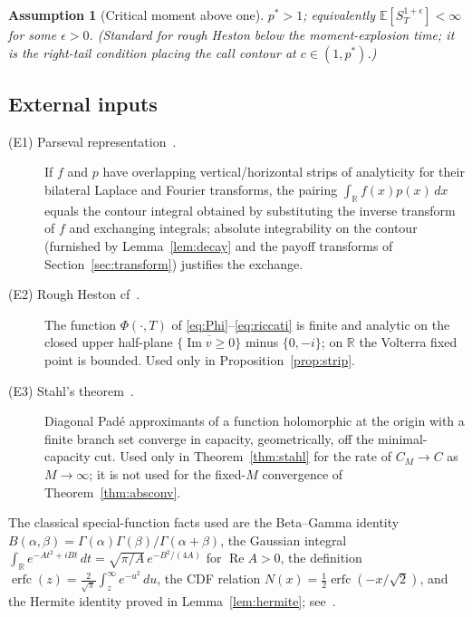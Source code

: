 \documentclass[11pt]{article}
\newtheorem{assumption}[theorem]{Assumption}
\newcommand{\R}{\mathbb{R}}
\newcommand{\E}{\mathbb{E}}
\DeclareMathOperator{\Real}{Re}
\DeclareMathOperator{\Imag}{Im}
\DeclareMathOperator{\erfc}{erfc}
\begin{document}
\begin{assumption}[Critical moment above one]\label{A4}
$p^*>1$; equivalently $\E[S_T^{1+\epsilon}]<\infty$ for some $\epsilon>0$.
\textup{(Standard for rough Heston below the moment-explosion time; it is
the right-tail condition placing the call contour at $c\in(1,p^*)$.)}
\end{assumption}

\subsection{External inputs}

\begin{description}
\item[(E1) Parseval representation~\cite{Widder}.] If $f$ and
$p$ have overlapping vertical/horizontal strips of analyticity for their
bilateral Laplace and Fourier transforms, the pairing $\int_\R f(x)p(x)\,dx$
equals the contour integral obtained by substituting the inverse transform
of $f$ and exchanging integrals; absolute integrability on the contour
(furnished by Lemma~\ref{lem:decay} and the payoff transforms of
Section~\ref{sec:transform}) justifies the exchange.
\item[(E2) Rough Heston cf~\cite{ElEuchRosenbaum}.] The function
$\Phi(\cdot,T)$ of \eqref{eq:Phi}--\eqref{eq:riccati} is finite and analytic
on the closed upper half-plane $\overline{\{\Imag v\ge0\}}$ minus
$\{0,-i\}$; on $\R$ the Volterra fixed point is bounded. Used only in
Proposition~\ref{prop:strip}.
\item[(E3) Stahl's theorem~\cite{Stahl}.] Diagonal Pad\'e approximants of a
function holomorphic at the origin with a finite branch set converge in
capacity, geometrically, off the minimal-capacity cut. Used only in
Theorem~\ref{thm:stahl} for the rate of $C_M\to C$ as $M\to\infty$; it is
not used for the fixed-$M$ convergence of Theorem~\ref{thm:absconv}.
\end{description}

The classical special-function facts used are the Beta--Gamma identity
$B(\alpha,\beta)=\Gamma(\alpha)\Gamma(\beta)/\Gamma(\alpha+\beta)$, the
Gaussian integral $\int_\R e^{-At^2+iBt}\,dt=\sqrt{\pi/A}\,e^{-B^2/(4A)}$
for $\Real A>0$, the definition $\erfc(z)=\tfrac{2}{\sqrt\pi}\int_z^\infty
e^{-u^2}\,du$, the CDF relation $N(x)=\tfrac12\erfc(-x/\sqrt2)$, and the
Hermite identity proved in Lemma~\ref{lem:hermite}; see~\cite{Olver}.

\end{document}
